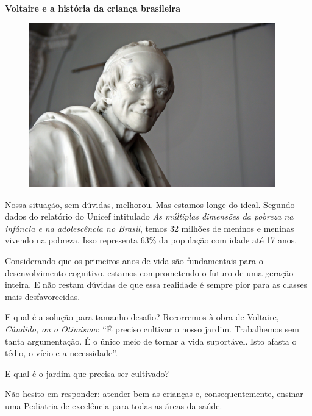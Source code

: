 \begin{myquote}

\textbf{Voltaire e a história da criança brasileira}

\begin{figure}[H]
\centering
\includegraphics[width=0.95\textwidth]{./imgSAEB_7_POR/media/image46.png}
\end{figure}

Nossa situação, sem dúvidas, melhorou. Mas estamos longe do ideal. Segundo
dados do relatório do Unicef intitulado \textit{As múltiplas dimensões da pobreza na
infância e na adolescência no Brasil}, temos 32 milhões de meninos e meninas
vivendo na pobreza. Isso representa 63\% da população com idade até 17 anos.

Considerando que os primeiros anos de vida são fundamentais para o
desenvolvimento cognitivo, estamos comprometendo o futuro de uma geração
inteira. E não restam dúvidas de que essa realidade é sempre pior para as
classes mais desfavorecidas.

E qual é a solução para tamanho desafio? Recorremos à obra de
Voltaire, \textit{Cândido, ou o Otimismo}: ``É preciso cultivar o nosso jardim.
Trabalhemos sem tanta argumentação. É o único meio de tornar a vida
suportável. Isto afasta o tédio, o vício e a necessidade''.

E qual é o jardim que precisa ser cultivado? 

Não hesito em responder: atender bem as crianças e, consequentemente, ensinar
uma Pediatria de excelência para todas as áreas da saúde.


\end{myquote}

